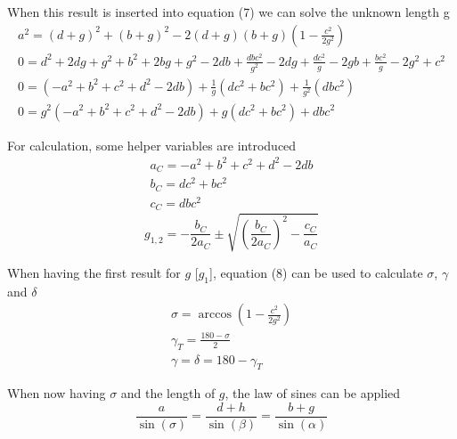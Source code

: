 \documentclass{article}
\begin{document}
    When this result is inserted into equation (7) we can solve the unknown length g
        \begin{equation} 
        \begin{array}{cc}
                a^2 = (d + g)^2 + (b + g)^2 - 2(d + g)(b + g)(1 - \frac{c^2}{2g^2}) \\
                0 = d^2 + 2dg + g^2 + b^2 + 2bg + g^2 - 2db + \frac{dbc^2}{g^2} - 2dg + \frac{dc^2}{g} - 2gb + \frac{bc^2}{g} - 2g^2 + c^2 \\
                0 = (-a^2 + b^2 + c^2 + d^2 - 2db) + \frac{1}{g}(dc^2 + bc^2) + \frac{1}{g^2}(dbc^2) \\
                0 = g^2 (-a^2 + b^2 + c^2 + d^2 - 2db) + g (dc^2 + bc^2) + dbc^2
        \end{array}
        \end{equation}
    
    For calculation, some helper variables are introduced
        \begin{equation} 
        \begin{array}{cc}
                a_C = -a^2 + b^2 + c^2 + d^2 - 2db\\
                b_C = dc^2 + bc^2\\
                c_C = dbc^2 
        \end{array}
        \end{equation}
        \begin{equation} 
        g_{1,2} = -\frac{b_C}{2a_C} \pm \sqrt{(\frac{b_C}{2a_C})^2 - \frac{c_C}{a_C}}
        \end{equation}
    
    When having the first result for $g$ [$g_1$], equation (8) can be used to calculate $\sigma$, $\gamma$ and $\delta$
        \begin{equation} 
        \begin{array}{cc}
                \sigma = \arccos(1 - \frac{c^2}{2g^2}) \\
                \gamma_T = \frac{180 - \sigma}{2} \\
                \gamma = \delta = 180 - \gamma_T
        \end{array}
        \end{equation}
    
    When now having $\sigma$ and the length of $g$, the law of sines can be applied
        \begin{equation} 
        \frac{a}{\sin(\sigma)} = \frac{d + h}{\sin(\beta)} = \frac{b + g}{\sin(\alpha)}
        \end{equation}
    
\end{document}
